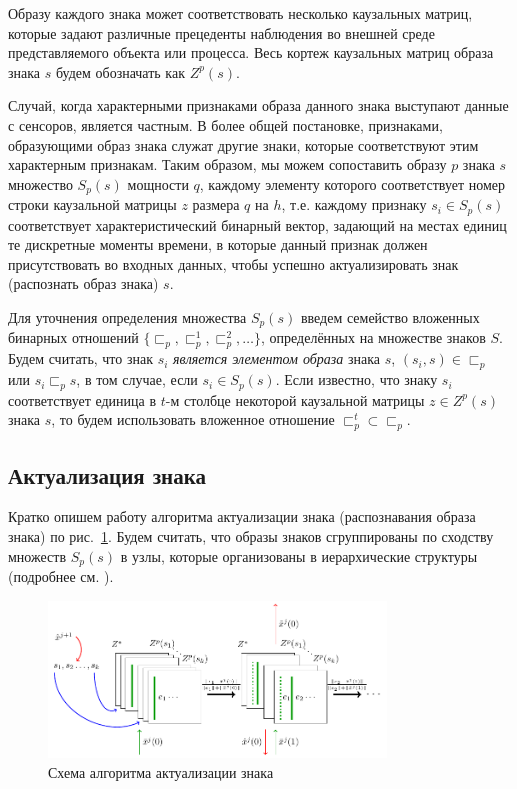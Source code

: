 \documentclass[12pt]{scrartcl}
\begin{document}
	Образу каждого знака может соответствовать несколько каузальных матриц, которые задают различные прецеденты наблюдения во внешней среде представляемого объекта или процесса. Весь кортеж каузальных матриц образа знака $s$ будем обозначать как $Z^p(s)$. 
	
	Случай, когда характерными признаками образа данного знака выступают данные с сенсоров, является частным. В более общей постановке, признаками, образующими образ знака служат другие знаки, которые соответствуют этим характерным признакам. Таким образом, мы можем сопоставить образу $p$ знака $s$ множество $S_p(s)$ мощности $q$, каждому элементу которого соответствует номер строки каузальной матрицы $z$ размера $q$ на $h$, т.е. каждому признаку $s_i\in S_p(s)$ соответствует характеристический бинарный вектор, задающий на местах единиц те дискретные моменты времени, в которые данный признак должен присутствовать во входных данных, чтобы успешно актуализировать знак (распознать образ знака) $s$. 
	
	Для уточнения определения множества $S_p(s)$ введем семейство вложенных бинарных отношений $\{\sqsubset_p,\sqsubset_p^1,\sqsubset_p^2,\dots\}$, определённых на множестве знаков $S$. Будем считать, что знак $s_i$ \textit{является элементом образа} знака $s$, $(s_i,s)\in\sqsubset_p$ или $s_i\sqsubset_p s$, в том случае, если $s_i\in S_p(s)$. Если известно, что знаку $s_i$ соответствует единица в $t$-м столбце некоторой каузальной матрицы $z\in Z^p(s)$ знака $s$, то будем использовать вложенное отношение $\sqsubset_p^t\subset \sqsubset_p$.
	
	\subsection{Актуализация знака}
	
	Кратко опишем работу алгоритма актуализации знака (распознавания образа знака) по рис.~\ref{fig:percept}. Будем считать, что образы знаков сгруппированы по сходству множеств $S_p(s)$ в узлы, которые организованы в иерархические структуры (подробнее см. \cite{Panov2014d}).
	
	\begin{figure}
		\centering
		\includegraphics[width=0.8\textwidth]{algo/perception}
		\caption{Схема алгоритма актуализации знака}
		\label{fig:percept}		
	\end{figure}
\end{document}
